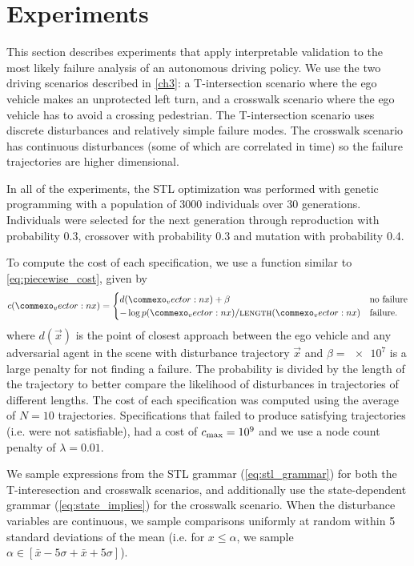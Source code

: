 \section{Experiments}
This section describes experiments that apply interpretable validation to the most likely failure analysis of an autonomous driving policy. We use the two driving scenarios described in \cref{ch3}: a T-intersection scenario where the ego vehicle makes an unprotected left turn, and a crosswalk scenario where the ego vehicle has to avoid a crossing pedestrian. The T-intersection scenario uses discrete disturbances and relatively simple failure modes. The crosswalk scenario has continuous disturbances (some of which are correlated in time) so the failure trajectories are higher dimensional. 

In all of the experiments, the STL optimization was performed with genetic programming with a population of \num{3000} individuals over \num{30} generations. Individuals were selected for the next generation through reproduction with probability \num{0.3}, crossover with probability \num{0.3} and mutation with probability \num{0.4}.

To compute the cost of each specification, we use a function similar to \cref{eq:piecewise_cost}, given by
\begin{equation}
    c(\vec{x}) = \begin{cases}
        d(\vec{x}) + \beta  & \text{no failure} \\
        -\log p(\vec{x}) / \textproc{length}(\vec{x}) & \text{failure} \text{.} 
    \end{cases}
\end{equation}
where $d(\vec{x})$ is the point of closest approach between the ego vehicle and any adversarial agent in the scene with disturbance trajectory $\vec{x}$ and $\beta = \num{e7}$ is a large penalty for not finding a failure. The probability is divided by the length of the trajectory to better compare the likelihood of disturbances in trajectories of different lengths. The cost of each specification was computed using the average of $N=10$ trajectories. Specifications that failed to produce satisfying trajectories (i.e. were not satisfiable), had a cost of $c_{\rm max} = \num{e9}$ and we use a node count penalty of $\lambda = 0.01$. 

We sample expressions from the STL grammar (\cref{eq:stl_grammar}) for both the T-interesection and crosswalk scenarios, and additionally use the state-dependent grammar (\cref{eq:state_implies}) for the crosswalk scenario. When the disturbance variables are continuous, we sample comparisons uniformly at random within \num{5} standard deviations of the mean (i.e. for $x \leq \alpha$, we sample $\alpha \in [\bar{x}-5\sigma + \bar{x} + 5 \sigma]$). 

